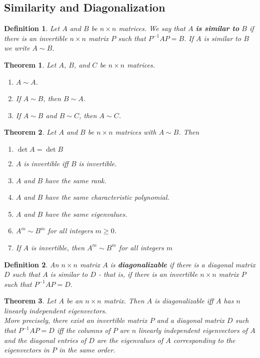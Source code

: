 \documentclass{article}
\theoremstyle{sltheorem}
\newtheorem{definition}{Definition}[section]
\newtheorem{theorem}{Theorem}[section]
\begin{document}
\subsection{Similarity and Diagonalization}
\begin{definition}
    Let $A$ and $B$ be $n\times n$ matrices. We say that $A$ \textbf{is similar to} $B$ if there is an invertible $n\times n$ matrix $P$ such that $P^{-1}AP=B$. If $A$ is similar to $B$ we write $A\sim B$.
\end{definition}
\begin{theorem}
    Let $A$, $B$, and $C$ be $n\times n$ matrices.
    \begin{enumerate}
        \item $A\sim A$.
        \item If $A\sim B$, then $B\sim A$.
        \item If $A\sim B$ and $B\sim C$, then $A\sim C$.
    \end{enumerate}
\end{theorem}
\begin{theorem}
    Let $A$ and $B$ be $n\times n$ matrices with $A\sim B$. Then
    \begin{enumerate}
        \item $\det A = \det B$
        \item $A$ is invertible iff $B$ is invertible.
        \item $A$ and $B$ have the same rank.
        \item $A$ and $B$ have the same characteristic polynomial.
        \item $A$ and $B$ have the same eigenvalues.
        \item $A^m\sim B^m$ for all integers $m\geq 0$.
        \item If $A$ is invertible, then $A^m\sim B^m$ for all integers $m$
    \end{enumerate}
\end{theorem}
\begin{definition}
    An $n\times n$ matrix $A$ is \textbf{diagonalizable} if there is a diagonal matrix $D$ such that $A$ is similar to $D$ - that is, if there is an invertible $n\times n$ matrix $P$ such that $P^{-1}AP = D$.
\end{definition}
\begin{theorem}
    Let $A$ be an $n\times n$ matrix. Then $A$ is diagonalizable iff $A$ has $n$ linearly independent eigenvectors.\\
    More precisely, there exist an invertible matrix $P$ and a diagonal matrix $D$ such that $P^{-1}AP=D$ iff the columns of $P$ are $n$ linearly independent eigenvectors of $A$ and the diagonal entries of $D$ are the eigenvalues of $A$ corresponding to the eigenvectors in $P$ in the same order.
\end{theorem}
\end{document}
